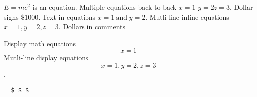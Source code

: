 \documentclass{article}
\begin{document}
$E = m c^2$ is an equation.
Multiple equations back-to-back $x=1$ $y=2$$z=3$.
Dollar signs $\$1000$.
Text in equations $x=1\ \text{and $y=2$}$.
Mutli-line inline equations $x = 1,
y = 2, z = 3$.
Dollars in comments %

Display math equations $$ x = 1 $$
Mutli-line display equations $$x = 1,
y = 2, z = 3$$.

\begin{verbatim}
  $ $ $
\end{verbatim}

\end{document}
